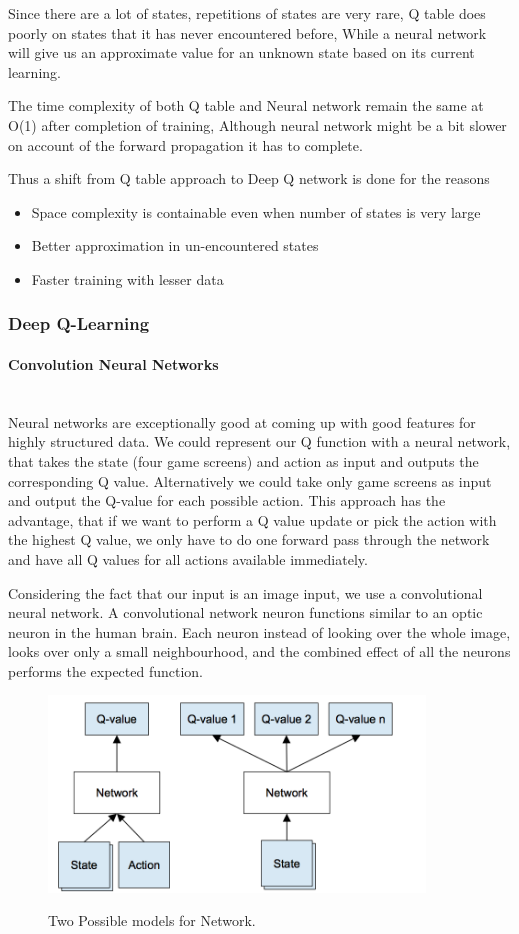 \documentclass[a4paper,11pt]{article}
\newcommand{\mparagraph}[1]{\paragraph{#1}\mbox{}\\}
\begin{document}
				Since there are a lot of states, repetitions of states are very rare, Q table does poorly on states that it has never encountered before, While a neural network will give us an approximate value for an unknown state based on its current learning. 

				The time complexity of both Q table and Neural network remain the same at O(1) after completion of training, Although neural network might be a bit slower on account of the forward propagation it has to complete.


				Thus a shift from Q table approach to Deep Q network is done for the reasons
				\begin{itemize}
				\item Space complexity is containable even when number of states is very large
				\item Better approximation in un-encountered states
				\item Faster training with lesser data
				\end{itemize}
			\subsubsection{Deep Q-Learning}
				\mparagraph{Convolution Neural Networks}
					Neural networks are exceptionally good at coming up with good features for highly structured data. We could represent our Q function with a neural network, that takes the state (four game screens) and action as input and outputs the corresponding Q value. Alternatively we could take only game screens as input and output the Q-value for each possible action. This approach has the advantage, that if we want to perform a Q value update or pick the action with the highest Q value, we only have to do one forward pass through the network and have all Q values for all actions available immediately.

					Considering the fact that our input is an image input, we use a convolutional neural network. A convolutional network neuron functions similar to an optic neuron in the human brain. Each neuron instead of looking over the whole image, looks over only a small neighbourhood, and the combined effect of all the neurons performs the expected function.

					\begin{figure}[!ht]
						\begin{centering}
							\includegraphics[width=10cm]{../Design/images/deep.png}\\
							\caption{Two Possible models for Network.}
						\end{centering}
					\end{figure}
\end{document}
